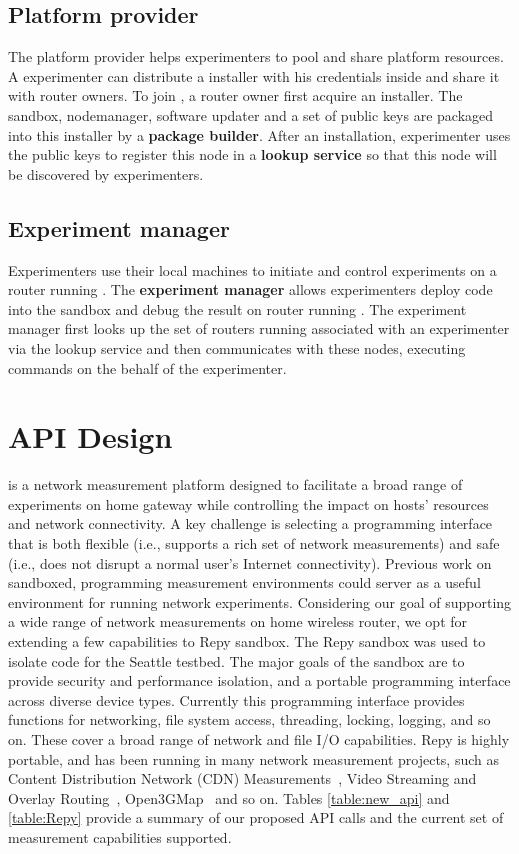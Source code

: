 \subsection{Platform provider}
The platform provider helps experimenters to pool and share platform resources. A experimenter can distribute a \sysname installer with his credentials inside and share it with router owners. To join \sysname, a router owner first acquire an \sysname installer. The sandbox, nodemanager, software updater and a set of public keys are packaged into this installer by a \textbf{package builder}. After an installation, experimenter uses the public keys to register this node in a \textbf{lookup service} so that this node will be discovered by experimenters.

\subsection{Experiment manager}
Experimenters use their local machines to initiate and control experiments on a router running \sysname. The \textbf{experiment manager} allows experimenters deploy code into the sandbox and debug the result on router running \sysname. The experiment manager first looks up the set of routers running \sysname associated with an experimenter via the lookup service and then communicates with these nodes, executing commands on the behalf of the experimenter.  

\section{API Design}
\sysname is a network measurement platform designed to facilitate a broad range of experiments on home gateway while controlling the impact on hosts' resources and network connectivity. A key challenge is selecting a programming interface that is both flexible (i.e., supports a rich set of network measurements) and safe (i.e., does not disrupt a normal user's Internet connectivity). Previous work on sandboxed, programming measurement environments \sysname could server as a useful environment for running network experiments. Considering our goal of supporting a wide range of network measurements on home wireless router, we opt for extending a few capabilities to Repy sandbox\cite{cappos2010retaining}. The Repy sandbox was used to isolate code for the Seattle testbed. The major goals of the sandbox are to provide security and performance isolation, and a portable programming interface across diverse device types. Currently this programming interface provides functions for networking, file system access, threading, locking, logging, and so on. These cover a broad range of network and file I/O capabilities. Repy is highly portable, and has been running in many network measurement projects, such as Content Distribution Network (CDN) Measurements~\cite{rafetseder2011exploring}, Video Streaming and Overlay Routing~\cite{eisl2011service}, Open3GMap~\cite{open3gmap} and so on. Tables \ref{table:new_api} and \ref{table:Repy} provide a summary of our proposed API calls and the current set of measurement capabilities \sysname supported. 

